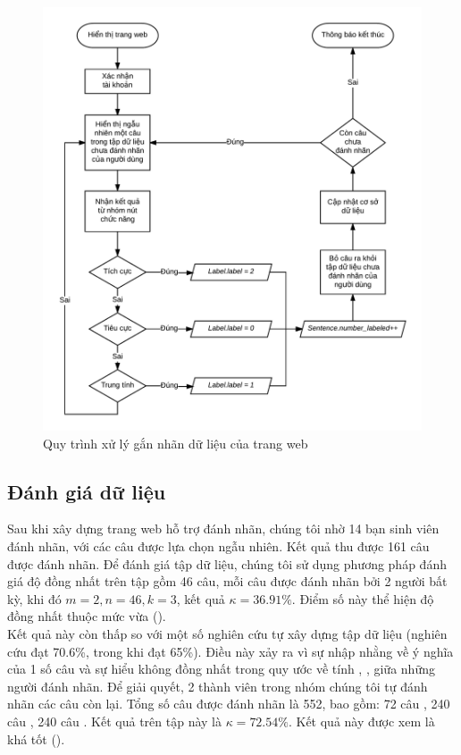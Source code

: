 \begin{figure}[H]
\centering
\includegraphics[scale=0.27]{../hinh/UpdateDatabase.png}
\caption{Quy trình xử lý gắn nhãn dữ liệu của trang web}
\label{fig:updatedb}
\end{figure}

\subsection*{Đánh giá dữ liệu}
Sau khi xây dựng trang web hỗ trợ đánh nhãn, chúng tôi nhờ 14 bạn sinh viên đánh nhãn, với các câu được lựa chọn ngẫu nhiên. Kết quả thu được 161 câu được đánh nhãn. Để đánh giá tập dữ liệu, chúng tôi sử dụng phương pháp đánh giá độ đồng nhất  trên tập gồm 46 câu, mỗi câu được đánh nhãn bởi 2 người bất kỳ, khi đó $m=2, n=46, k=3$, kết quả $\kappa = 36.91\% $. Điểm số này thể hiện độ đồng nhất thuộc mức vừa (). \\

Kết quả này còn thấp so với một số nghiên cứu tự xây dựng tập dữ liệu (nghiên cứu \cite{sarker2011outcome} đạt 70.6\%, trong khi \cite{ali2013can} đạt 65\%). Điều này xảy ra vì sự nhập nhằng về ý nghĩa của 1 số câu và sự hiểu không đồng nhất trong quy ước về tính \tichcuc, \tieucuc, \trungtinh giữa những người đánh nhãn. Để giải quyết, 2 thành viên trong nhóm chúng tôi tự đánh nhãn các câu còn lại. Tổng số câu được đánh nhãn là 552, bao gồm: 72 câu \tieucuc, 240 câu \trungtinh, 240 câu \tichcuc. Kết quả  trên tập này là $\kappa=72.54\%$. Kết quả này được xem là khá tốt ().

